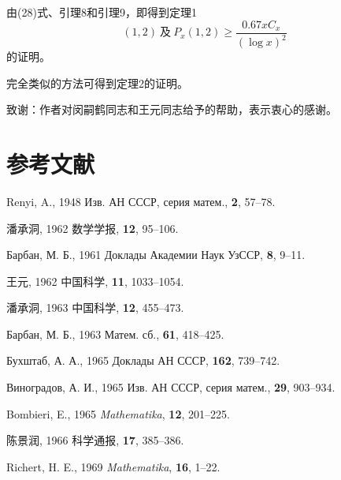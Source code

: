 由(28)式、引理8和引理9，即得到定理1
\[
(1,2)\ \text{及}\ P_x(1,2)\geqslant\frac{0.67xC_x}{(\log x)^2}
\]
的证明。

完全类似的方法可得到定理2的证明。

致谢：作者对闵嗣鹤同志和王元同志给予的帮助，表示衷心的感谢。

\section*{参考文献}

\begin{enumerate}[leftmargin=2.5em,label={[\arabic*]}]
\item Renyi, A., 1948 {\cyrfont Изв. АН СССР, серия матем.}, \textbf{2}, 57--78.
\item 潘承洞, 1962 数学学报, \textbf{12}, 95--106.
\item {\cyrfont Барбан, М. Б.}, 1961 {\cyrfont Доклады Академии Наук УзССР}, \textbf{8}, 9--11.
\item 王元, 1962 中国科学, \textbf{11}, 1033--1054.
\item 潘承洞, 1963 中国科学, \textbf{12}, 455--473.
\item {\cyrfont Барбан, М. Б.}, 1963 {\cyrfont Матем. сб.}, \textbf{61}, 418--425.
\item {\cyrfont Бухштаб, А. А.}, 1965 {\cyrfont Доклады АН СССР}, \textbf{162}, 739--742.
\item {\cyrfont Виноградов, А. И.}, 1965 {\cyrfont Изв. АН СССР, серия матем.}, \textbf{29}, 903--934.
\item Bombieri, E., 1965 \textit{Mathematika}, \textbf{12}, 201--225.
\item 陈景润, 1966 科学通报, \textbf{17}, 385--386.
\item Richert, H. E., 1969 \textit{Mathematika}, \textbf{16}, 1--22.
\end{enumerate}
